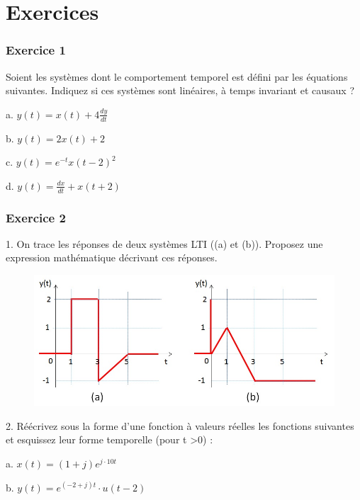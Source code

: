 	\vspace{1\baselineskip}	

	
	
	\section{Exercices}
	
	\subsubsection{Exercice 1} 
	Soient les systèmes dont le comportement temporel est défini par les équations suivantes. Indiquez si ces systèmes sont linéaires, à temps invariant et causaux ?
	
	a. $y(t) = x(t)+4\frac{dy}{dt}$ 
	
	b. $y(t) = 2x(t)+2$ 
	
	c. $y(t)=e^{-t}x(t-2)^{2}$
	
	d. $y(t)=\frac{dx}{dt}+x(t+2)$
	
	\vspace{1\baselineskip}
	
	\subsubsection{Exercice 2} 
	1. On trace les réponses de deux systèmes LTI ((a) et (b)). Proposez une expression mathématique décrivant ces réponses.
	\begin{figure}[h!]
		\centering
		\includegraphics[scale=0.5]{images/Exo_2_2.jpg} 
	\end{figure} 

	
	2. Réécrivez sous la forme d'une fonction à valeurs réelles les fonctions suivantes et esquissez leur forme temporelle (pour t >0) :
	
	a. $x(t) = (1+j)e^{j\cdot 10t}$ 
	
	b. $y(t) = e^{(-2+j)t}\cdot u(t-2)$ 
	
